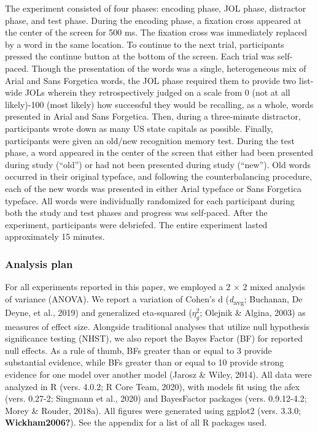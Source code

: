 \documentclass[
  english,
  jou]{apa7}
\begin{document}
The experiment consisted of four phases: encoding phase, JOL phase, distractor phase, and test phase. During the encoding phase, a fixation cross appeared at the center of the screen for 500 ms. The fixation cross was immediately replaced by a word in the same location. To continue to the next trial, participants pressed the continue button at the bottom of the screen. Each trial was self-paced. Though the presentation of the words was a single, heterogeneous mix of Arial and Sans Forgetica words, the JOL phase required them to provide two list-wide JOLs wherein they retrospectively judged on a scale from 0 (not at all likely)-100 (most likely) how successful they would be recalling, as a whole, words presented in Arial and Sans Forgetica. Then, during a three-minute distractor, participants wrote down as many US state capitals as possible. Finally, participants were given an old/new recognition memory test. During the test phase, a word appeared in the center of the screen that either had been presented during study (``old'') or had not been presented during study (``new''). Old words occurred in their original typeface, and following the counterbalancing procedure, each of the new words was presented in either Arial typeface or Sans Forgetica typeface. All words were individually randomized for each participant during both the study and test phases and progress was self-paced. After the experiment, participants were debriefed. The entire experiment lasted approximately 15 minutes.

\hypertarget{analysis-plan}{%
\subsubsection{Analysis plan}\label{analysis-plan}}

For all experiments reported in this paper, we employed a 2 × 2 mixed analysis of variance (ANOVA). We report a variation of Cohen's d (\emph{d}\textsubscript{avg}; Buchanan, De Deyne, et al., 2019) and generalized eta-squared (\(\eta_{g}^{2}\); Olejnik \& Algina, 2003) as measures of effect size. Alongside traditional analyses that utilize null hypothesis significance testing (NHST), we also report the Bayes Factor (BF) for reported null effects. As a rule of thumb, BFs greater than or equal to 3 provide substantial evidence, while BFs greater than or equal to 10 provide strong evidence for one model over another model (Jarosz \& Wiley, 2014). All data were analyzed in R (vers. 4.0.2; R Core Team, 2020), with models fit using the afex (vers. 0.27-2; Singmann et al., 2020) and BayesFactor packages (vers. 0.9.12-4.2; Morey \& Rouder, 2018a). All figures were generated using ggplot2 (vers. 3.3.0; \textbf{Wickham2006?}). See the appendix for a list of all R packages used.
\end{document}
